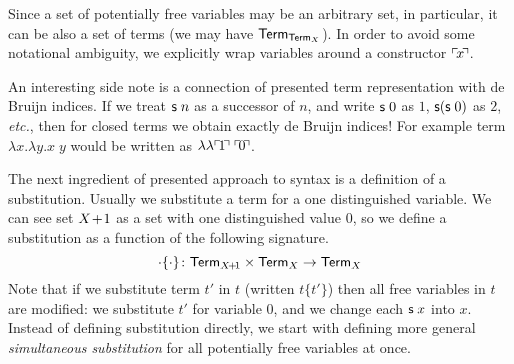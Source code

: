 Since a set of potentially free variables may be an arbitrary set,
in particular, it can be also a set of terms (we may have $\mathsf{Term}_{\mathsf{Term}_{X}}$).
In order to avoid some notational ambiguity, we explicitly wrap variables around
a constructor $\ulcorner\! x \!\urcorner$.

An interesting side note is a connection of presented term representation with
de Bruijn indices.
If we treat $\mathsf{s}\;n$ as a successor of $n$, and write $\mathsf{s}\;0$ as $1$,
$\mathsf{s}(\mathsf{s}\;0)$ as $2$, \emph{etc.},
then for closed terms we obtain exactly de Bruijn indices!
For example term $\lambda x.\lambda y. x\;y$
would be written as $\lambda\lambda \ulcorner\! 1 \!\urcorner\;\ulcorner\! 0 \!\urcorner$.

The next ingredient of presented approach to syntax is
a definition of a substitution.
Usually we substitute a term for a one distinguished variable.
We can see set $X\!+\!1$ as a set with one distinguished value $0$,
so we define a substitution as a function of the following signature.
\[
	\cdot\{\cdot\}\colon
  \mathsf{Term}_{X\!+\!1} \times \mathsf{Term}_{X} \to \mathsf{Term}_{X}
\]
Note that if we substitute term $t'$ in $t$ (written $t\{t'\}$)
then all free variables in $t$ are modified:
we substitute $t'$ for variable $0$,
and we change each $\mathsf{s}\;x$ into $x$.
Instead of defining substitution directly,
we start with defining more general \emph{simultaneous substitution}
for all potentially free variables at once.

